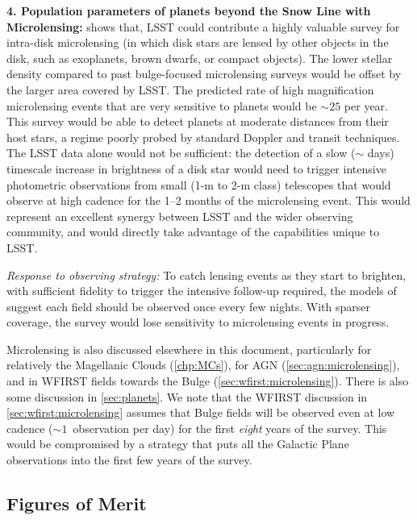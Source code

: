 {\bf 4. Population parameters of planets beyond the Snow Line with
  Microlensing:} \citet{gould13}  shows that, LSST could contribute a
highly valuable survey for intra-disk microlensing (in which disk
stars are lensed by other objects in the disk, such as exoplanets,
brown dwarfs, or compact objects). The lower stellar density compared
to past bulge-focused microlensing surveys would be offset by the
larger area covered by LSST. The predicted rate of high magnification
microlensing events that are very sensitive to planets would be $\sim
25$ per year. This survey would be able to detect planets at moderate
distances from their host stars, a regime poorly probed by standard
Doppler and transit techniques. The LSST data alone would not be
sufficient: the detection of a slow ($\sim$ days) timescale increase
in brightness of a disk star would need to trigger intensive
photometric observations from small (1-m to 2-m class) telescopes that
would observe at high cadence for the 1--2 months of the microlensing
event. This would represent an excellent synergy between LSST and the
wider observing community, and would directly take advantage of the
capabilities unique to LSST.

{\it Response to observing strategy:} To catch lensing events as they
start to brighten, with sufficient fidelity to trigger the intensive
follow-up required, the models of \citet{gould13} suggest each field
should be observed once every few nights. With sparser coverage, the
survey would lose sensitivity to microlensing events in
progress. 

Microlensing is also discussed elsewhere in this document, particularly
for relatively the Magellanic Clouds (\autoref{chp:MCs}), for AGN
(\autoref{sec:agn:microlensing}), and in WFIRST fields towards the
Bulge (\autoref{sec:wfirst:microlensing}). There is also some
discussion in \autoref{sec:planets}. We note that the WFIRST
discussion in \autoref{sec:wfirst:microlensing} assumes that Bulge
fields will be observed even at low cadence ($\sim 1$~observation per
day) for the first {\it eight} years of the survey. This would be
compromised by a strategy that puts all the Galactic Plane observations
into the first few years of the survey.


\subsection{Figures of Merit}
\label{sec:\secname:MW_Disk_metrics}

